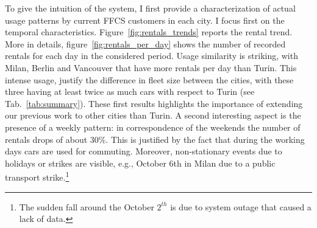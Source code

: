 To give the intuition of the system, I first provide a characterization of actual usage patterns by current FFCS customers in each city. I focus first on the temporal characteristics.
Figure~\ref{fig:rentals_trends} reports the rental trend. More in details, figure~\ref{fig:rentals_per_day} shows the number of recorded rentals for each day in the considered period. Usage similarity is striking, with Milan, Berlin and Vancouver that have more rentals per day than Turin. This intense usage, justify the difference in fleet size between the cities, with these three having at least twice as much cars with respect to Turin (see Tab.~\ref{tab:summary}). These first results highlights the importance of extending our previous work to other cities than Turin. A second interesting aspect is the presence of a weekly pattern: in correspondence of the weekends the number of rentals drops of about 30\%. This is justified by the fact that during the working days cars are used for commuting. Moreover, non-stationary events due to holidays or strikes are visible, e.g., October 6th in Milan due to a public transport strike.\footnote{The sudden fall around the October $2^{th}$ is due to system outage that caused a lack of data.} 

